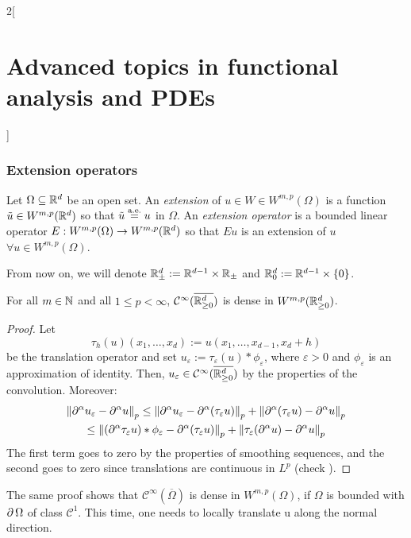 \documentclass[../../../main_math.tex]{subfiles}
\begin{document}
\begin{multicols}{2}[\section{Advanced topics in functional analysis and PDEs}]
  \subsubsection{Extension operators}
  \begin{definition}
    Let $\Omega\subseteq \mathbb{R}^d$ be an open set. An \emph{extension} of $u\in W\in W^{m,p}(\Omega)$ is a function $\tilde{u}\in W^{m,p}(\mathbb{R}^d)$ so that $\tilde{u}\overset{\text{a.e.}}{=}u$ in $\Omega$. An \emph{extension operator} is a bounded linear operator $E:W^{m,p}(\Omega)\to W^{m,p}(\mathbb{R}^d)$ so that $Eu$ is an extension of $u$ $\forall u\in W^{m,p}(\Omega)$.
  \end{definition}
  \begin{remark}
    From now on, we will denote $\mathbb{R}_{\pm}^d:=\mathbb{R}^{d-1}\times\mathbb{R}_{\pm}$ and $\mathbb{R}_0^d:=\mathbb{R}^{d-1}\times\{0\}$.
  \end{remark}
  \begin{theorem}
    For all $m\in\mathbb{N}$ and all $1\leq p<\infty$, $\mathcal{C}^\infty(\overline{\mathbb{R}_{\geq 0}^d})$ is dense in $W^{m,p}(\mathbb{R}_{\geq 0}^d)$.
  \end{theorem}
  \begin{proof}
    Let $$
      \tau_h(u)(x_1,\ldots, x_d):=u(x_1,\ldots, x_{d-1},x_d+h)
    $$
    be the translation operator and set $u_\varepsilon:=\tau_{\varepsilon}(u)*\phi_\varepsilon$, where $\varepsilon>0$ and $\phi_\varepsilon$ is an approximation of identity. Then, $u_\varepsilon\in \mathcal{C}^\infty(\overline{\mathbb{R}_{\geq 0}^d})$ by the properties of the convolution. Moreover:
    \begin{multline*}
      \left\|\partial^\alpha u_\varepsilon-\partial^\alpha u\right\|_p \leq \left\|\partial^\alpha u_\varepsilon-\partial^\alpha (\tau_{\varepsilon}u)\right\|_p+\left\|\partial^\alpha (\tau_{\varepsilon}u)-\partial^\alpha u\right\|_p                         \\
      \leq \left\|(\partial^\alpha \tau_\varepsilon u)*\phi_\varepsilon-\partial^\alpha (\tau_{\varepsilon}u)\right\|_p+\left\|\tau_{\varepsilon}(\partial^\alpha u)-\partial^\alpha u\right\|_p
    \end{multline*}
    The first term goes to zero by the properties of smoothing sequences, and the second goes to zero since translations are continuous in $L^p$ (check ).
  \end{proof}
  \begin{remark}
    The same proof shows that $\mathcal{C}^\infty(\overline{\Omega})$ is dense in $W^{m,p}(\Omega)$, if $\Omega$ is bounded with $\operatorname{\partial}{\Omega}$ of class $\mathcal{C}^1$. This time, one needs to locally translate u along the normal direction.

\end{remark}
\end{multicols}
\end{document}
